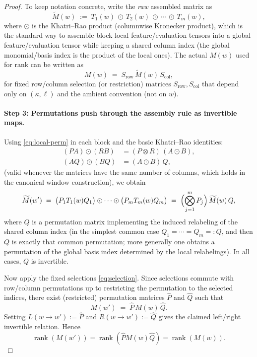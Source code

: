 \documentclass[12pt]{article}
\theoremstyle{definition}
\theoremstyle{remark}
\DeclareMathOperator{\rank}{rank}
\begin{document}
\begin{proof}
To keep notation concrete, write the \emph{raw} assembled matrix as
\[
\widetilde{M}(w)
\;:=\;
T_1(w)\ \odot\ T_2(w)\ \odot\ \cdots\ \odot\ T_m(w),
\]
where $\odot$ is the Khatri--Rao product (columnwise Kronecker product), which is
the standard way to assemble block-local feature/evaluation tensors into a global
feature/evaluation tensor while keeping a shared column index (the global
monomial/basis index is the product of the local ones).
The actual $M(w)$ used for rank can be written as
\begin{equation}
\label{eq:selection}
M(w) \;=\; S_{\mathrm{row}} \,\widetilde{M}(w)\, S_{\mathrm{col}},
\end{equation}
for fixed row/column selection (or restriction) matrices $S_{\mathrm{row}},S_{\mathrm{col}}$
that depend only on $(\kappa,\ell)$ and the ambient convention (not on $w$).

\paragraph{Step 3: Permutations push through the assembly rule as invertible maps.}
Using \eqref{eq:local-perm} in each block and the basic Khatri--Rao identities:
\begin{align}
(PA)\odot(RB) &= (P\otimes R)\,(A\odot B), \label{eq:kr-left}\\
(AQ)\odot(BQ) &= (A\odot B)\,Q, \label{eq:kr-right}
\end{align}
(valid whenever the matrices have the same number of columns, which holds in the
canonical window construction), we obtain
\[
\widetilde{M}(w')
\;=\;
\bigl(P_1T_1(w)Q_1\bigr)\odot\cdots\odot\bigl(P_mT_m(w)Q_m\bigr)
\;=\;
\Bigl(\bigotimes_{j=1}^m P_j\Bigr)\,
\widetilde{M}(w)\,
Q,
\]
where $Q$ is a permutation matrix implementing the induced relabeling of the shared
column index (in the simplest common case $Q_1=\cdots=Q_m=:Q$, and then $Q$ is exactly
that common permutation; more generally one obtains a permutation of the global basis
index determined by the local relabelings). In all cases, $Q$ is invertible.

Now apply the fixed selections \eqref{eq:selection}. Since selections commute with
row/column permutations up to restricting the permutation to the selected indices,
there exist (restricted) permutation matrices $\widehat{P}$ and $\widehat{Q}$ such that
\[
M(w') \;=\; \widehat{P}\, M(w)\, \widehat{Q}.
\]
Setting $L(w\to w'):=\widehat{P}$ and $R(w\to w'):=\widehat{Q}$ gives the claimed
left/right invertible relation. Hence
\[
\rank(M(w'))=\rank(\widehat{P}M(w)\widehat{Q})=\rank(M(w)).
\]


\end{proof}
\end{document}
